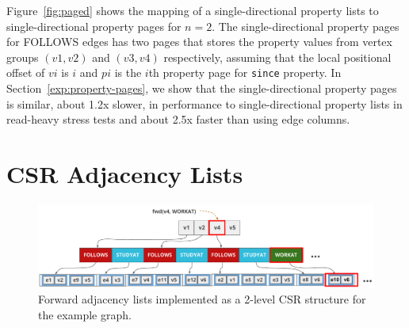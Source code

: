 Figure~\ref{fig:paged} shows the mapping of a single-directional property lists to single-directional property pages for $n=2$. The single-directional property pages for FOLLOWS edges has two pages that stores the property values from vertex groups $(v1,v2)$ and $(v3,v4)$ respectively, assuming that the local positional offset of $vi$ is $i$ and $pi$ is the $i$th property page for \texttt{since} property. 
In Section~\ref{exp:property-pages}, we show that the single-directional property pages is similar, about 1.2x slower, in performance to single-directional property lists in read-heavy stress tests and about 2.5x faster than using edge columns. 

\section{CSR Adjacency Lists}
\label{sec:adjacency-lists}

\begin{figure}
	\hspace{-15pt}
	\hfill\includegraphics[scale=0.75]{img/adjlists}\hspace*{\fill}
	\captionsetup{justification=centering}
	\caption{Forward adjacency lists implemented as a 2-level CSR structure for the example graph.}
	\label{fig:adjlists}
\end{figure}

